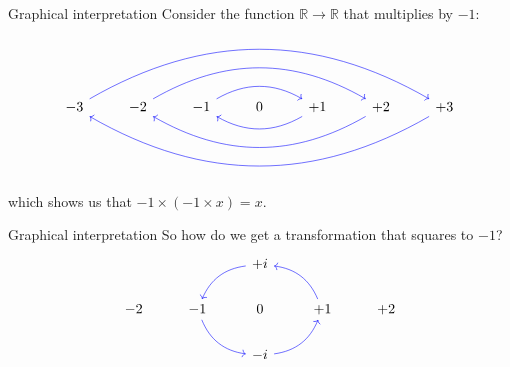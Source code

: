 \documentclass{beamer}
\begin{document}
\begin{frame}[fragile]{Graphical interpretation}
Consider the function $\mathbb{R} \rightarrow \mathbb{R}$ that multiplies by $-1$:
\begin{equation*}
\begin{tikzcd}
-3\arrow[bend left, color = blue]{rrrrrr} & -2\arrow[bend left, color = blue]{rrrr} & -1 \arrow[bend left, color = blue]{rr} & 0 & +1\arrow[bend left, color = blue]{ll} & +2\arrow[bend left, color = blue]{llll} & +3\arrow[bend left, color = blue]{llllll}\\
\end{tikzcd}
\end{equation*}
which shows us that $-1\times(-1\times x) = x$.
\end{frame}

\begin{frame}[fragile]{Graphical interpretation}
So how do we get a transformation that squares to $-1$?
\begin{equation*}
\begin{tikzcd}
{} & {} & +i \arrow[bend right, color = blue]{dl} & {} & {}\\
-2 & -1\arrow[bend right, color = blue]{dr} & 0 & +1 \arrow[bend right, color = blue]{ul} & +2\\
{} & {} & -i\arrow[bend right, color = blue]{ur} & {} & {}
\end{tikzcd}
\end{equation*}
\end{frame}
\end{document}
